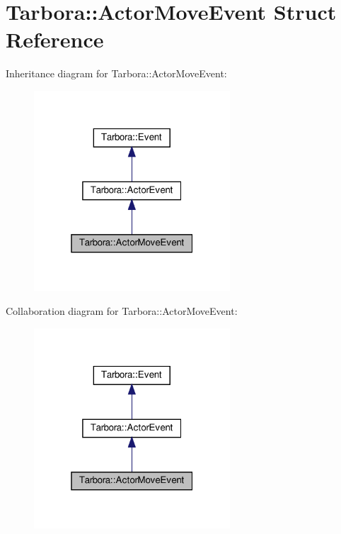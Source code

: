 \hypertarget{structTarbora_1_1ActorMoveEvent}{}\section{Tarbora\+:\+:Actor\+Move\+Event Struct Reference}
\label{structTarbora_1_1ActorMoveEvent}


Inheritance diagram for Tarbora\+:\+:Actor\+Move\+Event\+:\nopagebreak
\begin{figure}[H]
\begin{center}
\leavevmode
\includegraphics[width=208pt]{structTarbora_1_1ActorMoveEvent__inherit__graph}
\end{center}
\end{figure}


Collaboration diagram for Tarbora\+:\+:Actor\+Move\+Event\+:\nopagebreak
\begin{figure}[H]
\begin{center}
\leavevmode
\includegraphics[width=208pt]{structTarbora_1_1ActorMoveEvent__coll__graph}
\end{center}
\end{figure}

